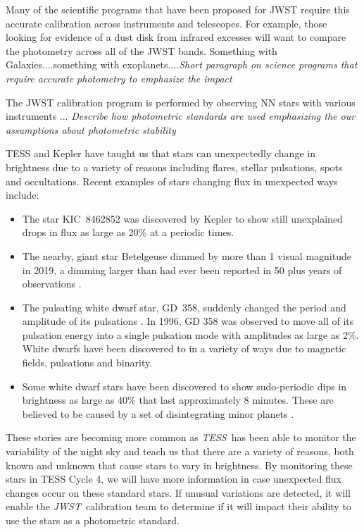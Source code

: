\documentclass[letterpaper,12pt]{article}
\newcommand{\tess}{{\it TESS}}
\newcommand{\jwst}{{\it JWST}}
\begin{document}
Many of the scientific programs that have been proposed for JWST require this accurate calibration across instruments and telescopes.  For example, those looking for evidence of a dust disk from infrared excesses will want to compare the photometry across all of the JWST bands.  Something with Galaxies....something with exoplanets....\textit{Short paragraph on science programs that require accurate photometry to emphasize the impact}

The JWST calibration program is performed by observing NN stars with various instruments ... \textit{Describe how photometric standards are used emphasizing the our assumptions about photometric stability}

TESS and Kepler have taught us that stars can unexpectedly change in brightness due to a variety of reasons including flares, stellar pulsations, spots and occultations. Recent examples of stars changing flux in unexpected ways include:
\begin{itemize}
    \item  The star KIC~8462852 \citep{Boyajian2016} was discovered by Kepler to show still unexplained drops in flux as large as 20\% at a periodic times.
    \item The nearby, giant star Betelgeuse \citep{Guinan2019} dimmed by more than 1 visual magnitude in 2019, a dimming larger than had ever been reported in 50 plus years of observations \citep{Levesque2020ApJ}.
    \item The pulsating white dwarf star, GD~358, suddenly changed the period and amplitude of its pulsations \citep{Montgomery2010}. In 1996, GD 358 was observed to move all of its pulsation energy into a single pulsation mode with amplitudes as large as 2\%. White dwarfs have been discovered to in a variety of ways \citep{Hermes2017} due to magnetic fields, pulsations and binarity.
    \item Some white dwarf stars have been discovered to show sudo-periodic dips in brightness as large as 40\% that last approximately 8 minutes. These are believed to be caused by a set of disintegrating minor planets \citep{Vanderburg2015}.
\end{itemize}

These stories are becoming more common as \tess\ has been able to monitor the variability of the night sky and teach us that there are a variety of reasons, both known and unknown that cause stars to vary in brightness. By monitoring these stars in TESS Cycle 4, we will have more information in case unexpected flux changes occur on these standard stars. If unusual variations are detected, it will enable the \jwst\ calibration team to determine if it will impact their ability to use the stars as a photometric standard. 
\end{document}
